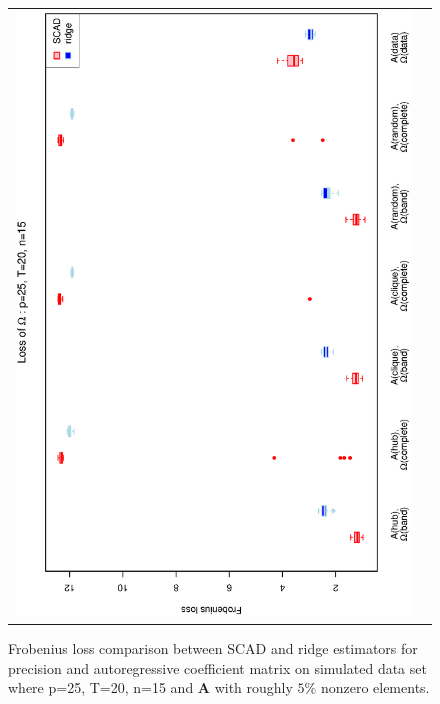 \documentclass[a4paper]{article}
\begin{document}
\begin{figure}[h!]
\begin{tabular}{cc}
\includegraphics[scale=0.45,angle=270]{LossOmega25T20N15_5.eps}
\end{tabular}
\caption{Frobenius loss comparison between SCAD and ridge estimators for precision and autoregressive coefficient matrix on simulated data set where p=25, T=20, n=15  and $\mathbf{A}$ with roughly $5\%$ nonzero elements.}
\label{figSM:Loss25T20N15_5}
\end{figure}

\end{document}

